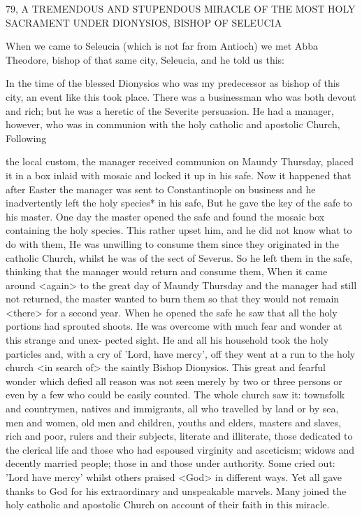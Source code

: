 79, A TREMENDOUS AND STUPENDOUS MIRACLE
OF THE MOST HOLY SACRAMENT
UNDER DIONYSIOS, BISHOP OF SELEUCIA

When we came to Seleucia (which is not far from Antioch) we met
Abba Theodore, bishop of that same city, Seleucia, and he told us
this:

In the time of the blessed Dionysios who was my predecessor as
bishop of this city, an event like this took place. There was a
businessman who was both devout and rich; but he was a heretic of
the Severite persuasion. He had a manager, however, who was in
communion with the holy catholic and apostolic Church, Following

the local custom, the manager received communion on Maundy
Thursday, placed it in a box inlaid with mosaic and locked it up in
his safe. Now it happened that after Easter the manager was sent to
Constantinople on business and he inadvertently left the holy
species* in his safe, But he gave the key of the safe to his master.
One day the master opened the safe and found the mosaic box
containing the holy species. This rather upset him, and he did not
know what to do with them, He was unwilling to consume them
since they originated in the catholic Church, whilst he was of the
sect of Severus. So he left them in the safe, thinking that the
manager would return and consume them, When it came around
<again> to the great day of Maundy Thursday and the manager
had still not returned, the master wanted to burn them so that they
would not remain <there> for a second year. When he opened the
safe he saw that all the holy portions had sprouted shoots. He was
overcome with much fear and wonder at this strange and unex-
pected sight. He and all his household took the holy particles and,
with a cry of 'Lord, have mercy', off they went at a run to the holy
church <in search of> the saintly Bishop Dionysios. This great and
fearful wonder which defied all reason was not seen merely by two
or three persons or even by a few who could be easily counted. The
whole church saw it: townsfolk and countrymen, natives and
immigrants, all who travelled by land or by sea, men and women,
old men and children, youths and elders, masters and slaves, rich
and poor, rulers and their subjects, literate and illiterate, those
dedicated to the clerical life and those who had espoused virginity
and asceticism; widows and decently married people; those in and
those under authority. Some cried out: 'Lord have mercy' whilst
others praised <God> in different ways. Yet all gave thanks to God
for his extraordinary and unspeakable marvels. Many joined the
holy catholic and apostolic Church on account of their faith in this
miracle.


